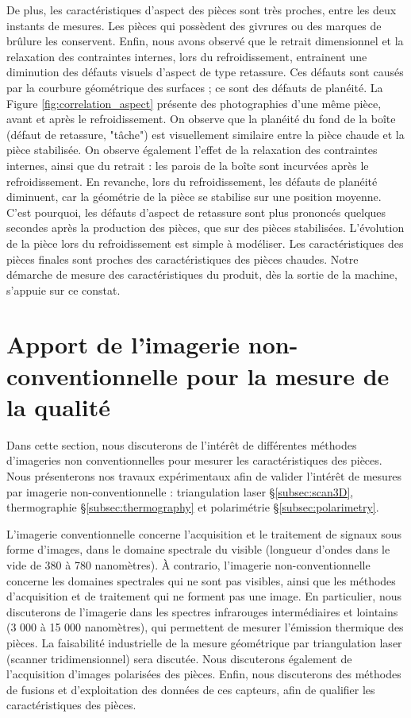 De plus, les caractéristiques d'aspect des pièces sont très proches, entre les deux instants de mesures.
Les pièces qui possèdent des givrures ou des marques de brûlure les conservent.
Enfin, nous avons observé que le retrait dimensionnel et la relaxation des contraintes internes, lors du refroidissement, entrainent une diminution des défauts visuels d'aspect de type retassure.
Ces défauts sont causés par la courbure géométrique des surfaces ; ce sont des défauts de planéité.
La Figure \ref{fig:correlation_aspect} présente des photographies d'une même pièce, avant et après le refroidissement.
On observe que la planéité du fond de la boîte (défaut de retassure, "tâche") est visuellement similaire entre la pièce chaude et la pièce stabilisée.
On observe également l'effet de la relaxation des contraintes internes, ainsi que du retrait : les parois de la boîte sont incurvées après le refroidissement.
En revanche, lors du refroidissement, les défauts de planéité diminuent, car la géométrie de la pièce se stabilise sur une position moyenne.
C'est pourquoi, les défauts d'aspect de retassure sont plus prononcés quelques secondes après la production des pièces, que sur des pièces stabilisées.
L'évolution de la pièce lors du refroidissement est simple à modéliser.
Les caractéristiques des pièces finales sont proches des caractéristiques des pièces chaudes.
Notre démarche de mesure des caractéristiques du produit, dès la sortie de la machine, s'appuie sur ce constat.

\section{Apport de l'imagerie non-conventionnelle pour la mesure de la qualité} \label{sec:non_conventional_imaging}
Dans cette section, nous discuterons de l'intérêt de différentes méthodes d'imageries non conventionnelles pour mesurer les caractéristiques des pièces.
Nous présenterons nos travaux expérimentaux afin de valider l'intérêt de mesures par imagerie non-conventionnelle : triangulation laser §\ref{subsec:scan3D}, thermographie §\ref{subsec:thermography} et polarimétrie §\ref{subsec:polarimetry}.

L'imagerie conventionnelle concerne l'acquisition et le traitement de signaux sous forme d'images, dans le domaine spectrale du visible (longueur d'ondes dans le vide de 380 à 780 nanomètres).
À contrario, l'imagerie non-conventionnelle concerne les domaines spectrales qui ne sont pas visibles, ainsi que les méthodes d'acquisition et de traitement qui ne forment pas une image.
En particulier, nous discuterons de l'imagerie dans les spectres infrarouges intermédiaires et lointains (3 000 à 15 000 nanomètres), qui permettent de mesurer l'émission thermique des pièces.
La faisabilité industrielle de la mesure géométrique par triangulation laser (scanner tridimensionnel) sera discutée.
Nous discuterons également de l'acquisition d'images polarisées des pièces.
Enfin, nous discuterons des méthodes de fusions et d'exploitation des données de ces capteurs, afin de qualifier les caractéristiques des pièces.

